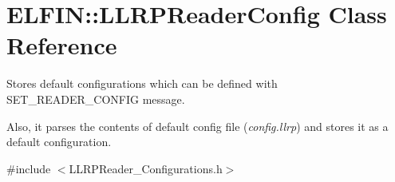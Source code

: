 \hypertarget{class_e_l_f_i_n_1_1_l_l_r_p_reader_config}{\section{E\-L\-F\-I\-N\-:\-:L\-L\-R\-P\-Reader\-Config Class Reference}
\label{class_e_l_f_i_n_1_1_l_l_r_p_reader_config}
}


Stores default configurations which can be defined with S\-E\-T\-\_\-\-R\-E\-A\-D\-E\-R\-\_\-\-C\-O\-N\-F\-I\-G message.\par
Also, it parses the contents of default config file ({\itshape config.\-llrp}) and stores it as a default configuration.  




{\ttfamily \#include $<$L\-L\-R\-P\-Reader\-\_\-\-Configurations.\-h$>$}

